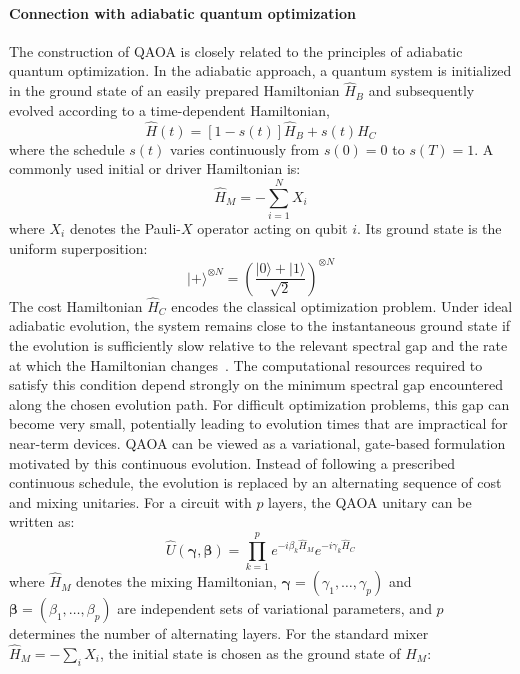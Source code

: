 \paragraph{Connection with adiabatic quantum optimization}
The construction of QAOA is closely related to the principles of adiabatic quantum optimization. In the adiabatic approach, a quantum system is initialized in the ground state of an easily prepared Hamiltonian $\hat{H}_B$ and subsequently evolved according to a time-dependent Hamiltonian,
\begin{equation}
\hat{H}(t) = [1-s(t)]\hat{H}_B
+
s(t)\hat{H}_C
\end{equation}
where the schedule $s(t)$ varies continuously from $s(0)=0$ to $s(T)=1$. A commonly used initial or driver Hamiltonian is:
\begin{equation}
\hat{H}_M = -\sum_{i=1}^{N}X_i
\end{equation}
where $X_i$ denotes the Pauli-$X$ operator acting on qubit $i$. Its ground state is the uniform superposition:
\begin{equation}
|+\rangle^{\otimes N} = \left(\frac{|0\rangle+|1\rangle}{\sqrt{2}}\right)^{\otimes N}
\end{equation}
The cost Hamiltonian $\hat{H}_C$ encodes the classical optimization problem. Under ideal adiabatic evolution, the system remains close to the instantaneous ground state if the evolution is sufficiently slow relative to the relevant spectral gap and the rate at which the Hamiltonian changes~\cite{nielsen2010quantum}. The computational resources required to satisfy this condition depend strongly on the minimum spectral gap encountered along the chosen evolution path. For difficult optimization problems, this gap can become very small, potentially leading to evolution times that are impractical for near-term devices.
QAOA can be viewed as a variational, gate-based formulation motivated by this continuous evolution. Instead of following a prescribed continuous schedule, the evolution is replaced by an alternating sequence of cost and mixing unitaries. For a circuit with $p$ layers, the QAOA unitary can be written as:
\begin{equation}
\hat{U}(\boldsymbol{\gamma},\boldsymbol{\beta}) = \prod_{k=1}^{p}
e^{-i\beta_k\hat{H}_M}
e^{-i\gamma_k\hat{H}_C}
\end{equation}
where $\hat{H}_M$ denotes the mixing Hamiltonian, $\boldsymbol{\gamma}=(\gamma_1,\ldots,\gamma_p)$ and $\boldsymbol{\beta}=(\beta_1,\ldots,\beta_p)$ are independent sets of variational parameters, and $p$ determines the number of alternating layers. For the standard mixer $\hat{H}_M=-\sum_iX_i$, the initial state is chosen as the ground state of $\hat{H}_M$:
